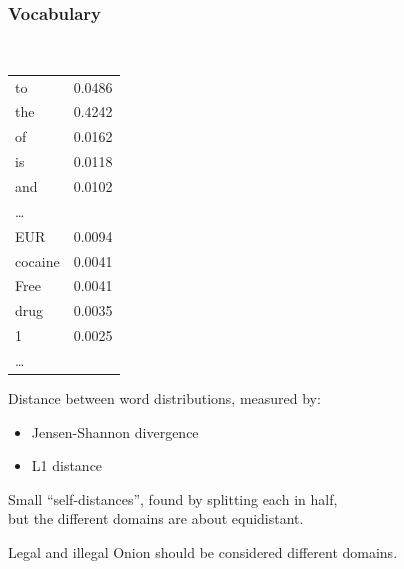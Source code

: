 \documentclass[t,xcolor={svgnames,table}]{beamer}
\begin{document}
\begin{frame}
	\frametitle{Vocabulary}
	
	\begin{flushright}
	\tt\small{}
	\setlength{\tabcolsep}{2pt}
	\begin{tabular}{||lr|}
	\hline
	to & 0.0486 \\
	the & 0.4242 \\
	of & 0.0162 \\
	is & 0.0118 \\
	and & 0.0102 \\
	\ldots & \\
	EUR & 0.0094 \\
	cocaine & 0.0041 \\
	Free & 0.0041 \\
	drug & 0.0035 \\
	1 & 0.0025 \\
	\ldots & \\
	\hline
	\end{tabular}
	\end{flushright}
	\vspace{-55mm}
	
	Distance between word distributions\pause, measured by:
	\begin{minipage}{.43\textwidth}
		\begin{itemize}
			\item Jensen-Shannon divergence
		\end{itemize}
	\end{minipage}
	\begin{minipage}{.3\textwidth}
		\begin{itemize}
			\item L1 distance
		\end{itemize}
	\end{minipage}
	\vfill
	
	Small ``self-distances'', found by splitting each in half{\pause}, \\ 
	but the different domains are about equidistant.
	
	\begin{center}
	\end{center}
	\pause
	
	Legal and illegal Onion should be considered different domains.
\end{frame}
\end{document}
